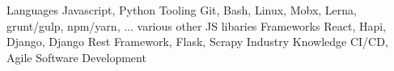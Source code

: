 
\begin{cvskills}
  \cvskill
    {Languages} %
    {Javascript, Python} %
  \cvskill
    {Tooling}
    {Git, Bash, Linux, Mobx, Lerna, grunt/gulp, npm/yarn, ... various other JS libaries}
  \cvskill
    {Frameworks} %
    {React, Hapi, Django, Django Rest Framework, Flask, Scrapy} %
  \cvskill
    {Industry Knowledge}
    {CI/CD, Agile Software Development}
\end{cvskills}
